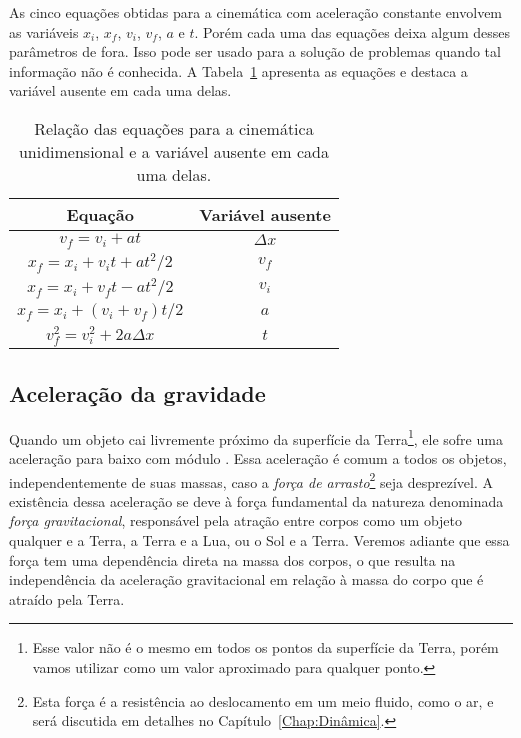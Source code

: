 As cinco equações obtidas para a cinemática com aceleração constante envolvem as variáveis $x_i$, $x_f$, $v_i$, $v_f$, $a$ e $t$. Porém cada uma das equações deixa algum desses parâmetros de fora. Isso pode ser usado para a solução de problemas quando tal informação não é conhecida. A Tabela~\ref{Tab:EqsCinematicasVarAusentes} apresenta as equações e destaca a variável ausente em cada uma delas.
\begin{table}[!h]
\centering
\begin{tabular}{cc}
\toprule
Equação & Variável ausente\\
\midrule
$v_f = v_i + at$ & $\Delta x$ \\
$x_f = x_i + v_i t + at^2 / 2$ & $v_f$ \\
$x_f = x_i + v_f t - at^2 / 2$ & $v_i$ \\
$x_f = x_i + (v_i + v_f) t / 2$ & $a$ \\
$v_f^2 = v_i^2 + 2 a \Delta x$ & $t$ \\
\bottomrule
\end{tabular}
\caption{Relação das equações para a cinemática unidimensional e a variável ausente em cada uma delas. \label{Tab:EqsCinematicasVarAusentes}}
\end{table}

\subsection{Aceleração da gravidade}

Quando um objeto cai livremente próximo da superfície da Terra\footnote{Esse valor não é o mesmo em todos os pontos da superfície da Terra, porém vamos utilizar  como um valor aproximado para qualquer ponto.}, ele sofre uma aceleração para baixo com módulo . Essa aceleração é comum a todos os objetos, independentemente de suas massas, caso a \emph{força de arrasto}\footnote{Esta força é a resistência ao deslocamento em um meio fluido, como o ar, e será discutida em detalhes no Capítulo~\ref{Chap:Dinâmica}.} seja desprezível. A existência dessa aceleração se deve à força fundamental da natureza denominada \emph{força gravitacional}, responsável pela atração entre corpos como um objeto qualquer e a Terra, a Terra e a Lua, ou o Sol e a Terra. Veremos adiante que essa força tem uma dependência direta na massa dos corpos, o que resulta na independência da aceleração gravitacional em relação à massa do corpo que é atraído pela Terra.

